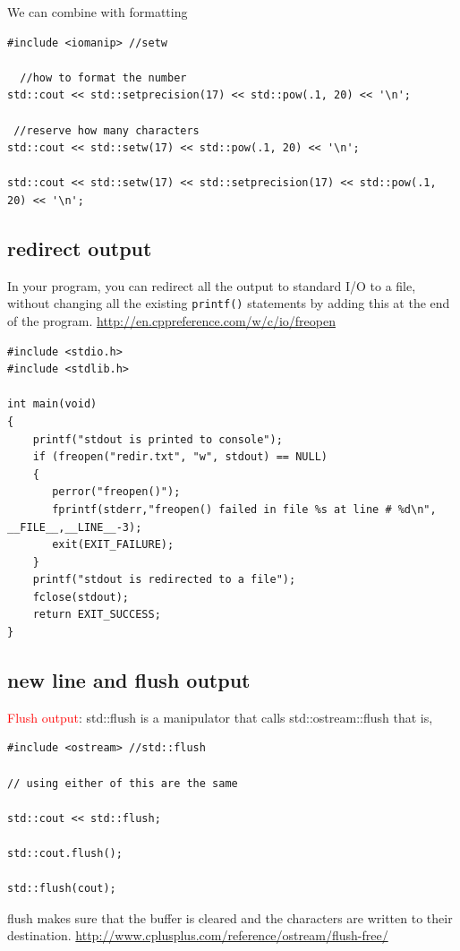 We can combine with formatting
\begin{verbatim}
#include <iomanip> //setw

  //how to format the number
std::cout << std::setprecision(17) << std::pow(.1, 20) << '\n';

 //reserve how many characters
std::cout << std::setw(17) << std::pow(.1, 20) << '\n'; 

std::cout << std::setw(17) << std::setprecision(17) << std::pow(.1, 20) << '\n'; 

\end{verbatim}

\subsection{redirect output}

In your program, you can redirect all the output to standard I/O to a file,
without changing all the existing \verb!printf()! statements by adding this at
the end of the program. \url{http://en.cppreference.com/w/c/io/freopen}
\begin{Verbatim}
#include <stdio.h>
#include <stdlib.h>

int main(void)
{
    printf("stdout is printed to console");
    if (freopen("redir.txt", "w", stdout) == NULL)
    {
       perror("freopen()");
       fprintf(stderr,"freopen() failed in file %s at line # %d\n", __FILE__,__LINE__-3);
       exit(EXIT_FAILURE);
    }
    printf("stdout is redirected to a file");
    fclose(stdout);
    return EXIT_SUCCESS;
}
\end{Verbatim}

\subsection{new line and flush output}


\textcolor{red}{Flush output}:  std::flush is a manipulator that calls
std::ostream::flush that is, 
\begin{verbatim}
#include <ostream> //std::flush

// using either of this are the same

std::cout << std::flush; 

std::cout.flush();

std::flush(cout);
\end{verbatim}
flush makes sure that the buffer is cleared and the characters are written to
their destination.
\url{http://www.cplusplus.com/reference/ostream/flush-free/}

